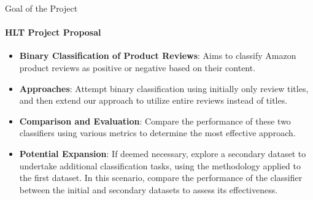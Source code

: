 \documentclass{beamer}
\theoremstyle{definition}
\theoremstyle{plain}
\begin{document}
\begin{frame}{Goal of the Project}
\framesubtitle{HLT Project Proposal}
{\small 
\begin{itemize}
    \item \textbf{Binary Classification of Product Reviews}: Aims to classify Amazon product reviews as positive or negative based on their content.
    \item \textbf{Approaches}: Attempt binary classification using initially only review titles, and then extend our approach to utilize entire reviews instead of titles.
    \item \textbf{Comparison and Evaluation}: Compare the performance of these two classifiers using various metrics to determine the most effective approach.
    \item \textbf{Potential Expansion}: If deemed necessary, explore a secondary dataset to undertake additional classification tasks, using the methodology applied to the first dataset. In this scenario, compare the performance of the classifier between the initial and secondary datasets to assess its effectiveness.
\end{itemize}

}
\end{frame}
\end{document}
